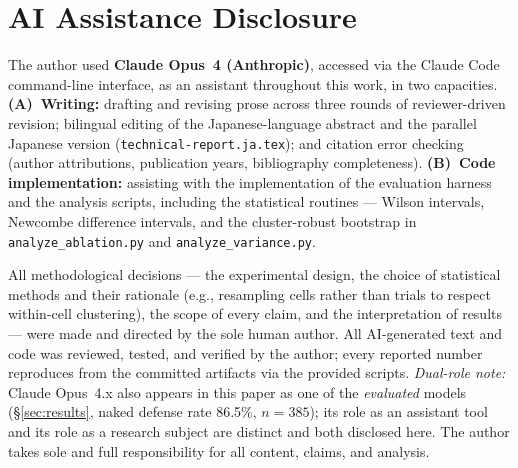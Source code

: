 \documentclass[11pt]{article}
\newcommand{\code}[1]{\texttt{#1}}
\begin{document}
\section*{AI Assistance Disclosure}
The author used \textbf{Claude Opus~4 (Anthropic)}, accessed via the Claude Code
command-line interface, as an assistant throughout this work, in two capacities.
\textbf{(A)~Writing:} drafting and revising prose across three rounds of
reviewer-driven revision; bilingual editing of the Japanese-language abstract and
the parallel Japanese version (\code{technical-report.ja.tex}); and citation error
checking (author attributions, publication years, bibliography completeness).
\textbf{(B)~Code implementation:} assisting with the implementation of the
evaluation harness and the analysis scripts, including the statistical routines ---
Wilson intervals, Newcombe difference intervals, and the cluster-robust bootstrap
in \code{analyze\_ablation.py} and \code{analyze\_variance.py}.

All methodological decisions --- the experimental design, the choice of statistical
methods and their rationale (e.g., resampling cells rather than trials to respect
within-cell clustering), the scope of every claim, and the interpretation of
results --- were made and directed by the sole human author. All AI-generated text
and code was reviewed, tested, and verified by the author; every reported number
reproduces from the committed artifacts via the provided scripts. \emph{Dual-role
note:} Claude Opus~4.x also appears in this paper as one of the \emph{evaluated}
models (\S\ref{sec:results}, naked defense rate 86.5\%, $n{=}385$); its role as an
assistant tool and its role as a research subject are distinct and both disclosed
here. The author takes sole and full responsibility for all content, claims, and
analysis.
\end{document}
